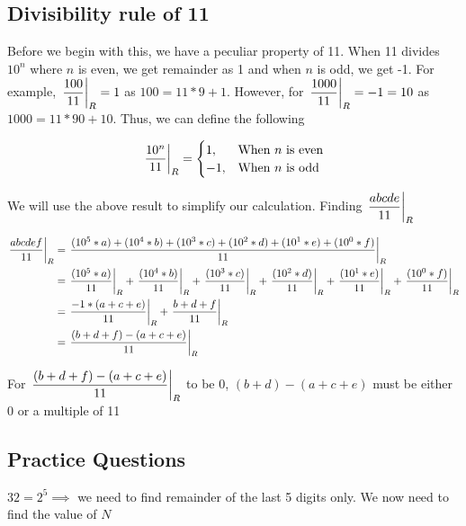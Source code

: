 \subsection{Divisibility rule of 11}

Before we begin with this, we have a peculiar property of 11. When 11 divides $10^n$ where $n$ is even, we get remainder as 1 and when $n$ is odd, we get -1. For example, $\displaystyle{ \left. \frac{100}{11} \right |_{R} } = 1 $ as $100 = 11 * 9 + 1$. However, for $\displaystyle{ \left. \frac{1000}{11} \right |_{R} } = -1 = 10$ as $1000 = 11 * 90 + 10$. Thus, we can define the following

\begin{equation*}
    \displaystyle{ \left. \frac{10^n}{11} \right |_{R} } = 
    \begin{cases}
        1, &\text{When $n$ is even} \\
        -1,&\text{When $n$ is odd}
    \end{cases}
\end{equation*}

We will use the above result to simplify our calculation. Finding $\displaystyle{ \left. \frac{abcde}{11} \right |_{R} }$

\begin{align*}
    \displaystyle{ \left. \frac{abcdef}{11} \right |_{R} } &= \displaystyle{ \left. \frac{(10^5 * a) + (10^4 * b) + (10^3 * c) + (10^2 * d) + (10^1 * e) + (10^0 * f)}{11} \right |_{R} } \\
    &= \displaystyle{ \left. \frac{(10^5 * a)}{11} \right |_{R} } + \displaystyle{ \left. \frac{(10^4 * b)}{11} \right |_{R} } +\displaystyle{ \left. \frac{(10^3 * c)}{11} \right |_{R} } + \displaystyle{ \left. \frac{(10^2 * d)}{11} \right |_{R} } + \displaystyle{ \left. \frac{(10^1 * e)}{11} \right |_{R} } + \displaystyle{ \left. \frac{(10^0 * f)}{11} \right |_{R} } \\
    &=\displaystyle{ \left. \frac{-1 * (a + c + e)}{11} \right |_{R} } + \displaystyle{ \left. \frac{b + d + f}{11} \right |_{R} } \\
    &=\displaystyle{ \left. \frac{(b + d + f) - (a + c + e)}{11} \right |_{R} }
\end{align*}

For $\displaystyle{ \left. \frac{(b + d + f) - (a + c + e)}{11} \right |_{R} }$ to be 0, $(b + d) - (a + c + e)$ must be either 0 or a multiple of 11

\subsection{Practice Questions}


$32 = 2^5 \implies$ we need to find remainder of the last 5 digits only. We now need to find the value of $N$

